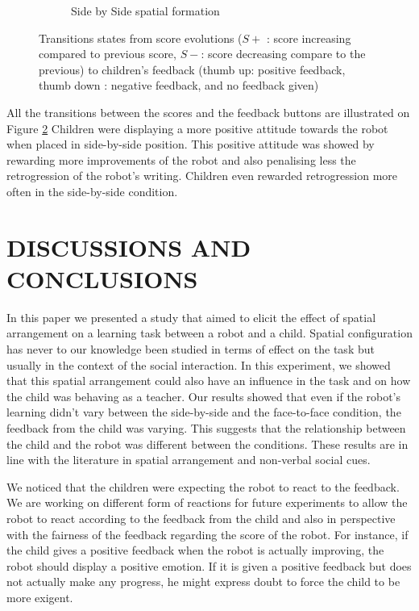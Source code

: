 \documentclass[letterpaper, 10 pt, conference]{ieeeconf}  %
\begin{document}
\begin{figure}
\begin{subfigure}{0.5\textwidth}
		\caption{Side by Side spatial formation}
		\label{fig:sbsstate}
	\end{subfigure}
	\caption{Transitions states from score evolutions ($S+$ : score increasing compared to previous score, $S-$: score decreasing compare to the previous) to children's feedback (thumb up: positive feedback, thumb down : negative feedback, and no feedback given)}
	\label{fig:state}
\end{figure}

All the transitions between the scores and the feedback buttons are illustrated on Figure \ref{fig:state}
Children were displaying a more positive attitude towards the robot when placed in side-by-side position.
This positive attitude was showed by rewarding more improvements of the robot and also penalising less the retrogression of the robot's writing.
Children even rewarded retrogression more often in the side-by-side condition.



\section{DISCUSSIONS AND CONCLUSIONS}
In this paper we presented a study that aimed to elicit the effect of spatial arrangement on a learning task between a robot and a child.
Spatial configuration has never to our knowledge been studied in terms of effect on the task but usually in the context of the social interaction.
In this experiment, we showed that this spatial arrangement could also have an influence in the task and on how the child was behaving as a teacher.
Our results showed that even if the robot's learning didn't vary between the side-by-side and the face-to-face condition, the feedback from the child was varying.
This suggests that the relationship between the child and the robot was different between the conditions.
These results are in line with the literature in spatial arrangement and non-verbal social cues.

We noticed that the children were expecting the robot to react to the feedback.
We are working on different form of reactions for future experiments to allow the robot to react according to the feedback from the child and also in perspective with the fairness of the feedback regarding the score of the robot.
For instance, if the child gives a positive feedback when the robot is actually improving, the robot should display a positive emotion.
If it is given a positive feedback but does not actually make any progress, he might express doubt to force the child to be more exigent. 
\end{document}
